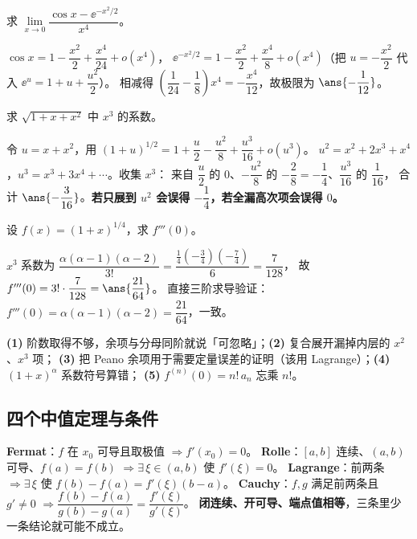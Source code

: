 \begin{exa}[相消型极限要展开够阶]
求 $\lim\limits_{x\to0}\dfrac{\cos x-\ee^{-x^2/2}}{x^4}$。
\end{exa}
\begin{solution}
$\cos x=1-\dfrac{x^2}{2}+\dfrac{x^4}{24}+o(x^4)$，
$\ee^{-x^2/2}=1-\dfrac{x^2}{2}+\dfrac{x^4}{8}+o(x^4)$（把 $u=-\dfrac{x^2}{2}$ 代入 $\ee^u=1+u+\dfrac{u^2}{2}$）。
相减得 $\left(\dfrac1{24}-\dfrac18\right)x^4=-\dfrac{x^4}{12}$，故极限为 $\ans{-\dfrac1{12}}$。
\end{solution}

\begin{exa}[复合展开别漏高次项]
求 $\sqrt{1+x+x^2}$ 中 $x^3$ 的系数。
\end{exa}
\begin{solution}
令 $u=x+x^2$，用 $(1+u)^{1/2}=1+\dfrac u2-\dfrac{u^2}{8}+\dfrac{u^3}{16}+o(u^3)$。
$u^2=x^2+2x^3+x^4$，$u^3=x^3+3x^4+\cdots$。收集 $x^3$：
来自 $\dfrac u2$ 的 $0$、$-\dfrac{u^2}{8}$ 的 $-\dfrac{2}{8}=-\dfrac14$、$\dfrac{u^3}{16}$ 的 $\dfrac1{16}$，
合计 $\ans{-\dfrac3{16}}$。\textbf{若只展到 $u^2$ 会误得 $-\dfrac14$，若全漏高次项会误得 $0$。}
\end{solution}

\begin{exa}[用系数求高阶导]
设 $f(x)=(1+x)^{1/4}$，求 $f'''(0)$。
\end{exa}
\begin{solution}
$x^3$ 系数为 $\dfrac{\alpha(\alpha-1)(\alpha-2)}{3!}=\dfrac{\frac14\left(-\frac34\right)\left(-\frac74\right)}{6}=\dfrac{7}{128}$，
故 $f'''(0)=3!\cdot\dfrac7{128}=\ans{\dfrac{21}{64}}$。
直接三阶求导验证：$f'''(0)=\alpha(\alpha-1)(\alpha-2)=\dfrac{21}{64}$，一致。
\end{solution}

\begin{warnbox}[泰勒章的失分点]
\textbf{(1)} 阶数取得不够，余项与分母同阶就说「可忽略」；\textbf{(2)} 复合展开漏掉内层的 $x^2$、$x^3$ 项；
\textbf{(3)} 把 Peano 余项用于需要定量误差的证明（该用 Lagrange）；\textbf{(4)} $(1+x)^\alpha$ 系数符号算错；
\textbf{(5)} $f^{(n)}(0)=n!\,a_n$ 忘乘 $n!$。
\end{warnbox}

\subsection{四个中值定理与条件}

\begin{keypoint}
\textbf{Fermat}：$f$ 在 $x_0$ 可导且取极值 $\Rightarrow f'(x_0)=0$。
\textbf{Rolle}：$[a,b]$ 连续、$(a,b)$ 可导、$f(a)=f(b)$ $\Rightarrow\exists\,\xi\in(a,b)$ 使 $f'(\xi)=0$。
\textbf{Lagrange}：前两条 $\Rightarrow\exists\,\xi$ 使 $f(b)-f(a)=f'(\xi)(b-a)$。
\textbf{Cauchy}：$f,g$ 满足前两条且 $g'\ne0$ $\Rightarrow\dfrac{f(b)-f(a)}{g(b)-g(a)}=\dfrac{f'(\xi)}{g'(\xi)}$。
\textbf{闭连续、开可导、端点值相等}，三条里少一条结论就可能不成立。
\end{keypoint}

